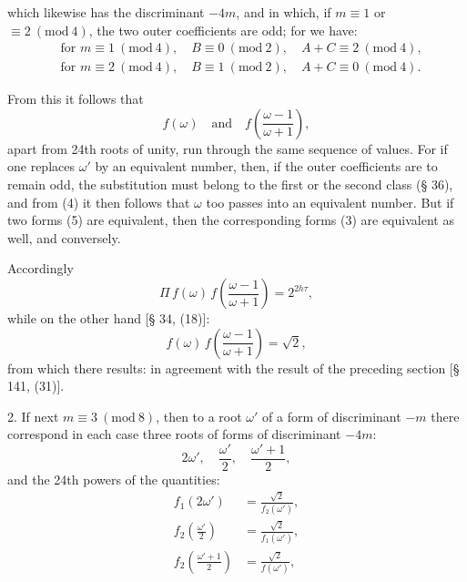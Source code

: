 which likewise has the discriminant $-4m$, and in which, if $m \equiv 1$
or $\equiv 2\ (\mathrm{mod}\ 4)$, the two outer coefficients are odd; for
we have:
\[
\begin{aligned}
&\text{for } m \equiv 1\ (\mathrm{mod}\ 4), \quad B \equiv 0\ (\mathrm{mod}\ 2), \quad A+C \equiv 2\ (\mathrm{mod}\ 4),\\
&\text{for } m \equiv 2\ (\mathrm{mod}\ 4), \quad B \equiv 1\ (\mathrm{mod}\ 2), \quad A+C \equiv 0\ (\mathrm{mod}\ 4).
\end{aligned}
\]

From this it follows that
\[
f(\omega) \quad\text{and}\quad f\left(\dfrac{\omega-1}{\omega+1}\right),
\]
apart from 24th roots of unity, run through the same sequence of values.
For if one replaces $\omega'$ by an equivalent number, then, if the outer
coefficients are to remain odd, the substitution must belong to the first
or the second class (§ 36), and from (4) it then follows that $\omega$ too
passes into an equivalent number. But if two forms (5) are equivalent,
then the corresponding forms (3) are equivalent as well, and conversely.

Accordingly
\[
\Pi\, f(\omega)\, f\!\left(\frac{\omega-1}{\omega+1}\right) = 2^{2h\tau},
\]
while on the other hand [§ 34, (18)]:
\[
f(\omega)\, f\!\left(\frac{\omega-1}{\omega+1}\right) = \sqrt{2},
\]
from which there results:
in agreement with the result of the preceding section [§ 141, (31)].

2. If next $m \equiv 3\ (\mathrm{mod}\ 8)$, then to a root
$\omega'$ of a form of discriminant $-m$ there correspond in each case three
roots of forms of discriminant $-4m$:
\[
2\omega', \quad \frac{\omega'}{2}, \quad \frac{\omega'+1}{2},
\]
and the 24th powers of the quantities:
\[
\begin{aligned}
f_1(2\omega') &= \frac{\sqrt{2}}{f_2(\omega')},\\
f_2\!\left(\frac{\omega'}{2}\right) &= \frac{\sqrt{2}}{f_1(\omega')},\\
f_2\!\left(\frac{\omega'+1}{2}\right) &= \frac{\sqrt{2}}{f(\omega')},
\end{aligned}
\]
